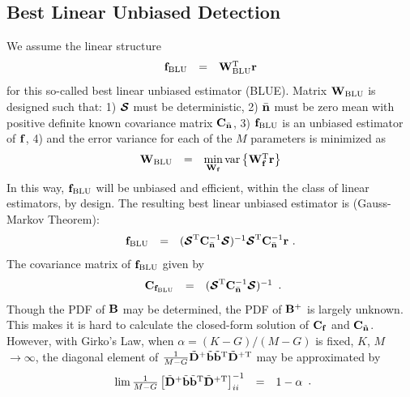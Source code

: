 \documentclass[a4paper,10pt,fleqn, twocolumn]{IEEETran}
\newcommand{\br}{{\mathbf r}}
\newcommand{\bb}{{\bf b}}
\newcommand{\bC}{{\bf C}}
\newcommand{\bn}{{\bf n}}
\newcommand{\bbf}{{\bf f}}
\newcommand{\bD}{{\bf D}}
\newcommand{\bW}{{\bf W}}
\newcommand{\bB}{{\bf B}}
\newcommand{\bcS}{{\mbox {\boldmath ${\cal S}$}}}
\begin{document}
\subsection{Best Linear Unbiased Detection}
We assume the linear structure
\begin{equation}
\begin{array}{rcl}
{\bbf}_{\rm BLU}&=&\bW_{\rm BLU}^{\rm T}\br
\end{array}
\end{equation}
\noindent for this so-called best linear unbiased estimator
(BLUE). Matrix $\bW_{\rm BLU}$ is designed such that: 1) $\bcS$
must be deterministic, 2) $\bar{\bn}$ must be zero mean with
positive definite known covariance matrix $\bC_{\bar{\bn}}$, 3)
${\bbf}_{\rm BLU}$ is an unbiased estimator of $\bbf$, 4) and the
error variance for each of the $M$ parameters is minimized as
\begin{equation}
\begin{array}{rcl}
\bW_{\rm BLU}&=&\min\limits_{\bW_{\bbf}}
\mbox{var}\left\{\bW_{\bbf}^{\rm T}\br\right\}
\end{array}
\end{equation}
\noindent In this way, ${\bbf}_{\rm BLU}$ will be unbiased and
efficient, within the class of linear estimators, by design. The
resulting best linear unbiased estimator is (Gauss-Markov
Theorem):
\begin{equation}
\begin{array}{rcl}
{\bbf}_{\rm BLU}&=&(\bcS^{\rm
T}\bC_{\bar{\bn}}^{-1}\bcS)^{-1}\bcS^{\rm
T}\bC_{\bar{\bn}}^{-1}\br\ .
\end{array} \label{BLUE}
\end{equation}
\noindent The covariance matrix of ${\bbf}_{\rm BLU}$ given by
\begin{equation}
\begin{array}{rcl}
{\bC}_{\bbf_{\rm BLU}}&=&(\bcS^{\rm
T}\bC_{\bar{\bn}}^{-1}\bcS)^{-1}
\end{array}.
\end{equation}
\noindent Though the PDF of $\bB$ may be determined, the PDF of
$\bB^{+}$ is largely unknown. This makes it is hard to calculate
the closed-form solution of $\bC_{\bbf}$ and $\bC_{\tilde{\bn}}$.
However, with Girko's Law, when $\alpha=(K-G)/(M-G)$ is fixed,
$K$, $M$ $\rightarrow\infty$, the diagonal element of
$\frac{1}{M-G}\tilde{\bD}^+\tilde{\bb}\tilde{\bb}^{\rm
T}\tilde{\bD}^{\rm +T}$ may be approximated
by~\cite{Muller,Hanly90}
\begin{equation}
\begin{array}{rcl}
\lim\frac{1}{M-G}\left[\tilde{\bD}^+\tilde{\bb}\tilde{\bb}^{\rm
T}\tilde{\bD}^{\rm +T}\right]_{ii}^{-1}&=&1-\alpha
\end{array}.
\end{equation}
\end{document}
